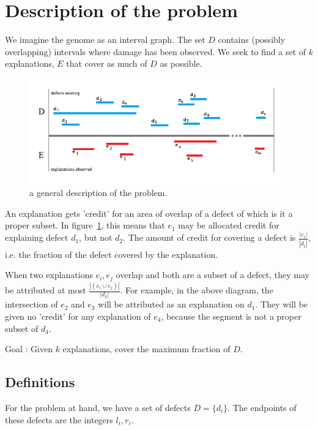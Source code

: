 \documentclass[11pt,twocolumn]{article}
\begin{document}
\section{Description of the problem}

We imagine the genome as an interval graph. The set $D$ contains (possibly overlapping) intervals where damage has been observed.  We seek to find a set of $k$ explanations, $E$ that cover as much of $D$ as possible.

\begin{figure}[ht!]
    \centering
        \includegraphics[width=0.99\textwidth]{baseline.png}
    \caption{a general description of the problem.}
\label{fig:genDesc1}
\end{figure}

An explanation gets 'credit' for an area of overlap of a defect of which is it a proper subset. In figure~\ref{fig:genDesc1}, this means that $e_1$ may be allocated credit for explaining defect $d_1$, but not $d_2$.  The amount of credit for covering a defect is $\frac{ | e_i |}{|d_j|}$, i.e. the fraction of the defect covered by the explanation.
 
When two explanations $e_i,e_j$ overlap and both are a subset of a defect, they may be attributed at most $\frac{ | (e_i \cup e_j) |}{|d_k|}$. For example, in the above diagram, the intersection of $e_2$ and $e_3$ will be attributed as an explanation on $d_1$. They will be given no 'credit' for any explanation of $e_4$, because the segment is not a proper subset of $d_4.$

Goal : Given $k$ explanations, cover the maximum fraction of $D$.

\subsection{Definitions}

For the problem at hand, we have a set of defects $D = \{d_i\}$.  The endpoints of these defects are the integers $l_i, r_i$.  
\end{document}
